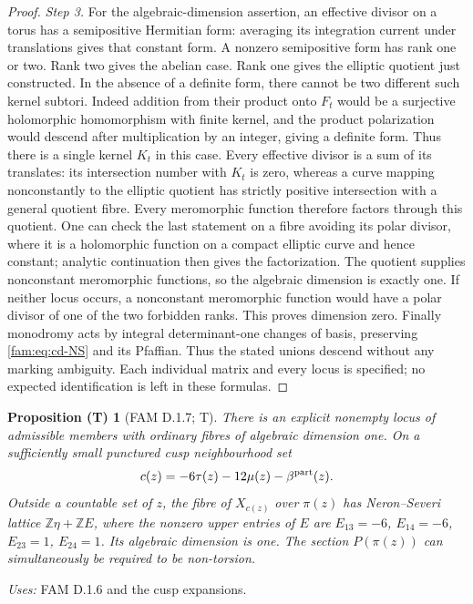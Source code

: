 \documentclass[11pt,a4paper]{article}
\theoremstyle{plain}
\newtheorem{proposition}[theorem]{Proposition (T)}
\theoremstyle{definition}
\begin{document}
\begin{proof}
\par\noindent\textit{Step 3.} For the algebraic-dimension assertion, an effective divisor on a torus
has a semipositive Hermitian form: averaging its integration current under
translations gives that constant form. A nonzero semipositive form has
rank one or two. Rank two gives the abelian case. Rank one gives the
elliptic quotient just constructed. In the absence of a definite form,
there cannot be two different such kernel subtori. Indeed addition from
their product onto $F_t$ would be a surjective holomorphic homomorphism
with finite kernel, and the product polarization would descend after
multiplication by an integer, giving a definite form. Thus there is a
single kernel $K_t$ in this case. Every effective divisor is a sum of
its translates: its intersection number with $K_t$ is zero, whereas a
curve mapping nonconstantly to the elliptic quotient has strictly positive
intersection with a general quotient fibre. Every meromorphic function
therefore factors through this quotient. One can check the last statement
on a fibre avoiding its polar divisor, where it is a holomorphic function
on a compact elliptic curve and hence constant; analytic continuation
then gives the factorization. The quotient supplies nonconstant
meromorphic functions, so the algebraic dimension is exactly one.
If neither locus occurs, a nonconstant meromorphic function would have
a polar divisor of one of the two forbidden ranks. This proves dimension
zero. Finally monodromy acts by integral determinant-one changes of basis,
preserving \eqref{fam:eq:cd-NS} and its Pfaffian. Thus the stated unions descend
without any marking ambiguity. Each individual matrix and every locus
is specified; no expected identification is left in these formulas.
\end{proof}

\begin{proposition}[FAM D.1.7; T]\label{fam:D.1.7}
There is an explicit nonempty locus of admissible members with ordinary
fibres of algebraic dimension one. On a sufficiently small punctured
cusp neighbourhood set
\[
 c(z)=-6\tau(z)-12\mu(z)-\beta^{\rm part}(z).
\]
Outside a countable set of $z$, the fibre of $X_{c(z)}$ over $\pi(z)$ has
Neron--Severi lattice $\mathbb Z\eta+\mathbb ZE$, where the nonzero upper
entries of $E$ are
$E_{13}=-6$, $E_{14}=-6$, $E_{23}=1$, $E_{24}=1$.
Its algebraic dimension is one. The section $P(\pi(z))$ can simultaneously
be required to be non-torsion.
\end{proposition}
\noindent\emph{Uses:} FAM D.1.6 and the cusp expansions.\par
\end{document}
